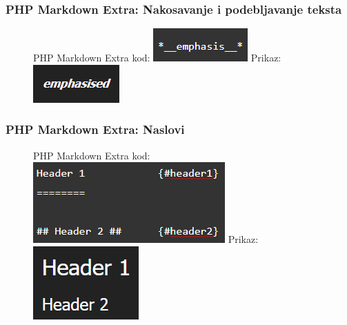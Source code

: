 \documentclass{beamer}
\begin{document}
\newpage

\begin{frame}
\frametitle{PHP Markdown Extra: Nakosavanje i podebljavanje teksta}
\begin{figure}
\centering
{PHP Markdown Extra kod:} 
\newline
\newline
\centering
\includegraphics[width = 0.5\linewidth]{nakipod1.png}
\newline
\newline
\centering
{Prikaz:}
\newline
\newline
\centering
\includegraphics[width = 0.5\linewidth]{nakipod2.png}
\end{figure}

\end{frame}


\newpage


\begin{frame}
\frametitle{PHP Markdown Extra: Naslovi}
\begin{figure}
\centering
{PHP Markdown Extra kod:}
\newline
\newline
\centering
\includegraphics[width = 0.5\linewidth]{naslov1.png}
\newline
\newline
\centering
{Prikaz:}
\newline
\newline
\centering
\includegraphics[width = 0.3\linewidth]{naslov2.png}
\end{figure}
\end{frame}
\end{document}
